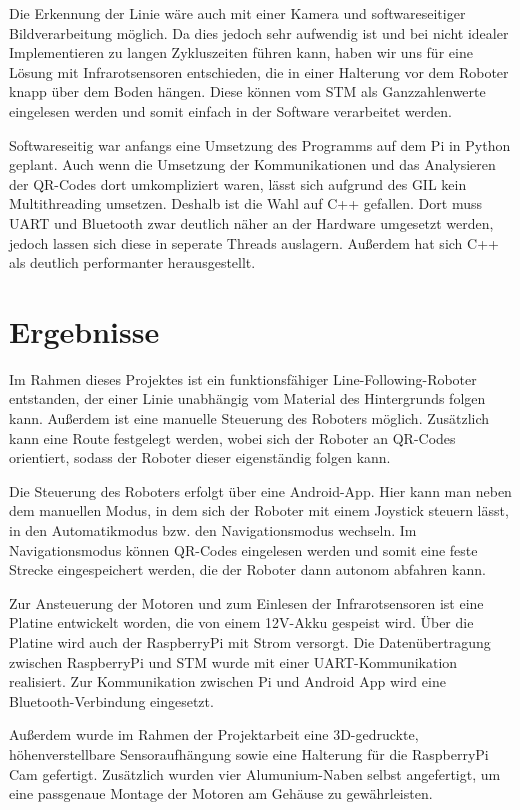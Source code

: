 \documentclass[12pt, a4paper]{report}
\begin{document}
Die Erkennung der Linie wäre auch mit einer Kamera und softwareseitiger Bildverarbeitung möglich. Da dies jedoch sehr aufwendig ist und bei nicht idealer Implementieren zu langen Zykluszeiten führen kann, haben wir uns für eine Lösung mit Infrarotsensoren entschieden, die in einer Halterung vor dem Roboter knapp über dem Boden hängen. Diese können vom STM als Ganzzahlenwerte eingelesen werden und somit einfach in der Software verarbeitet werden.

Softwareseitig war anfangs eine Umsetzung des Programms auf dem Pi in Python geplant. Auch wenn die Umsetzung der Kommunikationen und das Analysieren der QR-Codes dort umkompliziert waren, lässt sich aufgrund des GIL kein Multithreading umsetzen. Deshalb ist die Wahl auf C++ gefallen. Dort muss UART und Bluetooth zwar deutlich näher an der Hardware umgesetzt werden, jedoch lassen sich diese in seperate Threads auslagern. Außerdem hat sich C++ als deutlich performanter herausgestellt.


\chapter{Ergebnisse}

Im Rahmen dieses Projektes ist ein funktionsfähiger Line-Following-Roboter entstanden, der einer Linie unabhängig vom Material des Hintergrunds folgen kann. Außerdem ist eine manuelle Steuerung des Roboters möglich. Zusätzlich kann eine Route festgelegt werden, wobei sich der Roboter an QR-Codes orientiert, sodass der Roboter dieser eigenständig folgen kann.

Die Steuerung des Roboters erfolgt über eine Android-App. Hier kann man neben dem manuellen Modus, in dem sich der Roboter mit einem Joystick steuern lässt, in den Automatikmodus bzw. den Navigationsmodus wechseln. Im Navigationsmodus können QR-Codes eingelesen werden und somit eine feste Strecke eingespeichert werden, die der Roboter dann autonom abfahren kann.

Zur Ansteuerung der Motoren und zum Einlesen der Infrarotsensoren ist eine Platine entwickelt worden, die von einem 12V-Akku gespeist wird. Über die Platine wird auch der RaspberryPi mit Strom versorgt. Die Datenübertragung zwischen RaspberryPi und STM wurde mit einer UART-Kommunikation realisiert. Zur Kommunikation zwischen Pi und Android App wird eine Bluetooth-Verbindung eingesetzt.

Außerdem wurde im Rahmen der Projektarbeit eine 3D-gedruckte, höhenverstellbare Sensoraufhängung sowie eine Halterung für die RaspberryPi Cam gefertigt. Zusätzlich wurden vier Alumunium-Naben selbst angefertigt, um eine passgenaue Montage der Motoren am Gehäuse zu gewährleisten.
\end{document}
